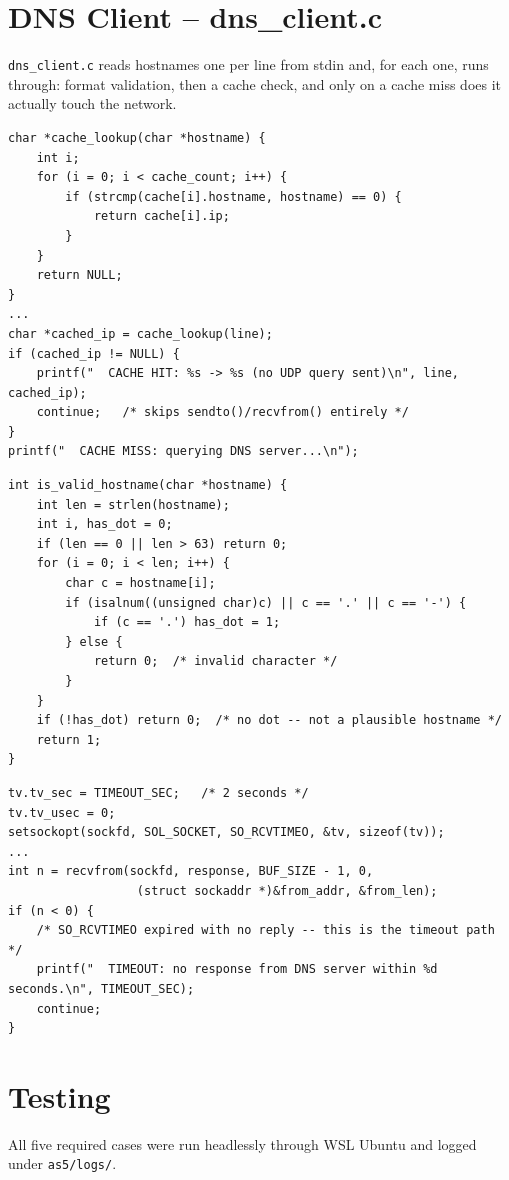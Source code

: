 \documentclass[11pt,a4paper]{article}
\begin{document}
\section*{DNS Client -- dns\_client.c}
\texttt{dns\_client.c} reads hostnames one per line from stdin and, for each
one, runs through: format validation, then a cache check, and only on a cache
miss does it actually touch the network.

\begin{lstlisting}[caption={dns\_client.c -- cache check BEFORE sending anything over UDP}]
char *cache_lookup(char *hostname) {
    int i;
    for (i = 0; i < cache_count; i++) {
        if (strcmp(cache[i].hostname, hostname) == 0) {
            return cache[i].ip;
        }
    }
    return NULL;
}
...
char *cached_ip = cache_lookup(line);
if (cached_ip != NULL) {
    printf("  CACHE HIT: %s -> %s (no UDP query sent)\n", line, cached_ip);
    continue;   /* skips sendto()/recvfrom() entirely */
}
printf("  CACHE MISS: querying DNS server...\n");
\end{lstlisting}

\begin{lstlisting}[caption={dns\_client.c -- basic hostname format validation, run before any socket call}]
int is_valid_hostname(char *hostname) {
    int len = strlen(hostname);
    int i, has_dot = 0;
    if (len == 0 || len > 63) return 0;
    for (i = 0; i < len; i++) {
        char c = hostname[i];
        if (isalnum((unsigned char)c) || c == '.' || c == '-') {
            if (c == '.') has_dot = 1;
        } else {
            return 0;  /* invalid character */
        }
    }
    if (!has_dot) return 0;  /* no dot -- not a plausible hostname */
    return 1;
}
\end{lstlisting}

\begin{lstlisting}[caption={dns\_client.c -- SO\_RCVTIMEO so a dead server can never hang the client}]
tv.tv_sec = TIMEOUT_SEC;   /* 2 seconds */
tv.tv_usec = 0;
setsockopt(sockfd, SOL_SOCKET, SO_RCVTIMEO, &tv, sizeof(tv));
...
int n = recvfrom(sockfd, response, BUF_SIZE - 1, 0,
                  (struct sockaddr *)&from_addr, &from_len);
if (n < 0) {
    /* SO_RCVTIMEO expired with no reply -- this is the timeout path */
    printf("  TIMEOUT: no response from DNS server within %d seconds.\n", TIMEOUT_SEC);
    continue;
}
\end{lstlisting}

\section*{Testing}
All five required cases were run headlessly through WSL Ubuntu and logged
under \texttt{as5/logs/}.
\end{document}
